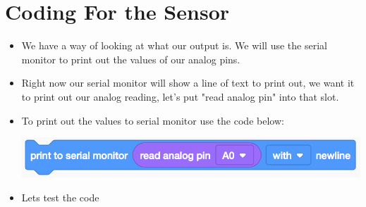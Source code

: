 \documentclass[12pt]{article}
\begin{document}
\section *{Coding For the Sensor}
	\begin{itemize}
		\item We have a way of looking at what our output is.  We will use the serial monitor to print out the values of our analog pins. 
		\item Right now our serial monitor will show a line of text to print out, we want it to print out our analog reading, let's put "read analog pin" into that slot.
		\item To print out the values to serial monitor use the code below:
		\begin{center}
			\includegraphics[scale = 0.7]{./Images/code1}
		\end{center}
		\item Lets test the code
	\end{itemize}
	
	
	
	
	
	
	
	
	
	
	
	
\end{document}
